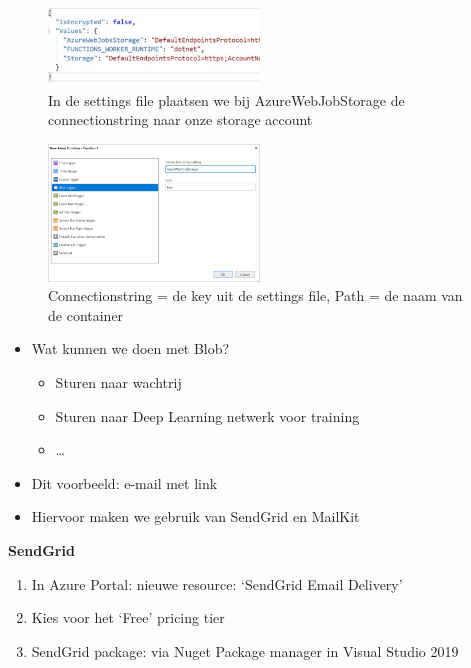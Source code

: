 \documentclass{article}
\newcommand{\bold}[1]{\textbf{#1}}
\begin{document}
\begin{figure}[H]
    \centering
    \includegraphics[width=0.5\textwidth]{scenario-2-1.png}
    \caption{In de settings file plaatsen we bij AzureWebJobStorage de connectionstring naar onze storage account}
\end{figure}

\begin{figure}[H]
    \centering
    \includegraphics[width=0.5\textwidth]{scenario-2-2.png}
    \caption{Connectionstring = de key uit de settings file, Path = de naam van de container}
\end{figure}

\begin{itemize}
    \item Wat kunnen we doen met Blob?
    \begin{itemize}
        \item Sturen naar wachtrij
        \item Sturen naar Deep Learning netwerk voor training
        \item \dots
    \end{itemize}
    \item Dit voorbeeld: e-mail met link
    \item Hiervoor maken we gebruik van SendGrid en MailKit
\end{itemize}

\bold{SendGrid}

\begin{enumerate}
    \item In Azure Portal: nieuwe resource: `SendGrid Email Delivery'
    \item Kies voor het `Free' pricing tier
    \item SendGrid package: via Nuget Package manager in Visual Studio 2019
\end{enumerate}
\end{document}
